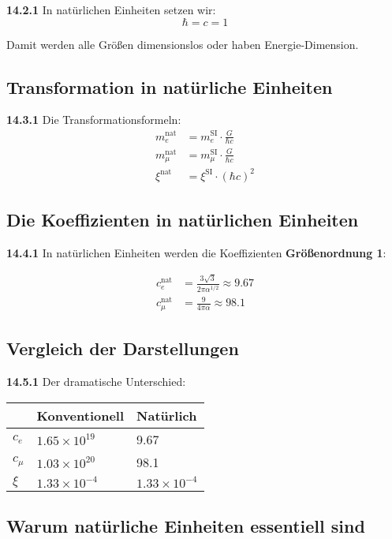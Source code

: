 \documentclass[12pt,a4paper]{article}
\begin{document}
\noindent \textbf{14.2.1} In natürlichen Einheiten setzen wir:
\[
\hbar = c = 1
\]

Damit werden alle Größen dimensionslos oder haben Energie-Dimension.

\subsection{Transformation in natürliche Einheiten}

\noindent \textbf{14.3.1} Die Transformationsformeln:
\begin{align*}
	m_e^{\text{nat}} &= m_e^{\text{SI}} \cdot \frac{G}{\hbar c} \\
	m_\mu^{\text{nat}} &= m_\mu^{\text{SI}} \cdot \frac{G}{\hbar c} \\
	\xi^{\text{nat}} &= \xi^{\text{SI}} \cdot (\hbar c)^2
\end{align*}

\subsection{Die Koeffizienten in natürlichen Einheiten}

\noindent \textbf{14.4.1} In natürlichen Einheiten werden die Koeffizienten \textbf{Größenordnung 1}:

\begin{align*}
	c_e^{\text{nat}} &= \frac{3\sqrt{3}}{2\pi\alpha^{1/2}} \approx 9.67 \\
	c_\mu^{\text{nat}} &= \frac{9}{4\pi\alpha} \approx 98.1
\end{align*}

\subsection{Vergleich der Darstellungen}

\noindent \textbf{14.5.1} Der dramatische Unterschied:

\begin{tabular}{lll}
	& Konventionell & Natürlich \\
	\midrule
	$c_e$ & $1.65 \times 10^{19}$ & 9.67 \\
	$c_\mu$ & $1.03 \times 10^{20}$ & 98.1 \\
	$\xi$ & $1.33 \times 10^{-4}$ & $1.33 \times 10^{-4}$ \\
\end{tabular}

\subsection{Warum natürliche Einheiten essentiell sind}
\end{document}
